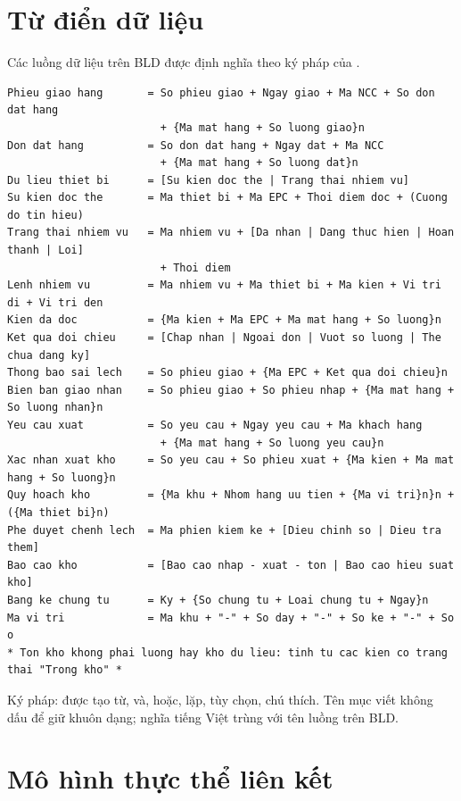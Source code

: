 \section{Từ điển dữ liệu}
\label{sec:tudien}

Các luồng dữ liệu trên BLD được định nghĩa theo ký pháp của \cite[Ch.~3]{tung_qlhttt}.

\begin{lstlisting}
Phieu giao hang       = So phieu giao + Ngay giao + Ma NCC + So don dat hang
                        + {Ma mat hang + So luong giao}n
Don dat hang          = So don dat hang + Ngay dat + Ma NCC
                        + {Ma mat hang + So luong dat}n
Du lieu thiet bi      = [Su kien doc the | Trang thai nhiem vu]
Su kien doc the       = Ma thiet bi + Ma EPC + Thoi diem doc + (Cuong do tin hieu)
Trang thai nhiem vu   = Ma nhiem vu + [Da nhan | Dang thuc hien | Hoan thanh | Loi]
                        + Thoi diem
Lenh nhiem vu         = Ma nhiem vu + Ma thiet bi + Ma kien + Vi tri di + Vi tri den
Kien da doc           = {Ma kien + Ma EPC + Ma mat hang + So luong}n
Ket qua doi chieu     = [Chap nhan | Ngoai don | Vuot so luong | The chua dang ky]
Thong bao sai lech    = So phieu giao + {Ma EPC + Ket qua doi chieu}n
Bien ban giao nhan    = So phieu giao + So phieu nhap + {Ma mat hang + So luong nhan}n
Yeu cau xuat          = So yeu cau + Ngay yeu cau + Ma khach hang
                        + {Ma mat hang + So luong yeu cau}n
Xac nhan xuat kho     = So yeu cau + So phieu xuat + {Ma kien + Ma mat hang + So luong}n
Quy hoach kho         = {Ma khu + Nhom hang uu tien + {Ma vi tri}n}n + ({Ma thiet bi}n)
Phe duyet chenh lech  = Ma phien kiem ke + [Dieu chinh so | Dieu tra them]
Bao cao kho           = [Bao cao nhap - xuat - ton | Bao cao hieu suat kho]
Bang ke chung tu      = Ky + {So chung tu + Loai chung tu + Ngay}n
Ma vi tri             = Ma khu + "-" + So day + "-" + So ke + "-" + So o
* Ton kho khong phai luong hay kho du lieu: tinh tu cac kien co trang thai "Trong kho" *
\end{lstlisting}

\noindent Ký pháp: \code{=} được tạo từ, \code{+} và, \code{[ | ]} hoặc,  lặp, \code{( )} tùy chọn, \code{* *} chú thích. Tên mục viết không dấu để giữ khuôn dạng; nghĩa tiếng Việt trùng với tên luồng trên BLD.

\section{Mô hình thực thể liên kết}
\label{sec:er}

